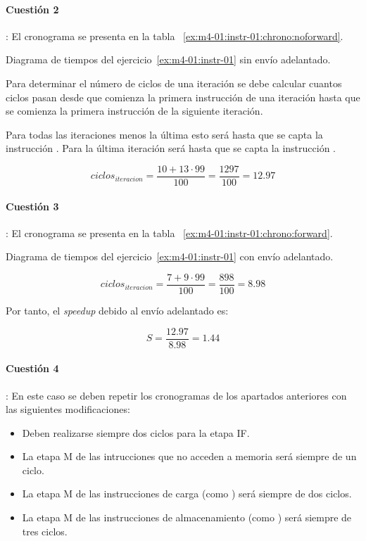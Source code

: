 \paragraph{Cuestión 2}: El cronograma se presenta en la tabla ~\ref{ex:m4-01:instr-01:chrono:noforward}.

\begin{table}[htb]

\caption{Diagrama de tiempos del ejercicio~\ref{ex:m4-01:instr-01} sin envío adelantado.}
\label{ex:m4-01:instr-01:chrono:noforward}
\end{table}

Para determinar el número de ciclos de una iteración se debe calcular cuantos ciclos
pasan desde que comienza la primera instrucción de una iteración hasta que se comienza
la primera instrucción de la siguiente iteración.

Para todas las iteraciones menos la última esto será hasta que se capta la
instrucción . Para la última iteración será hasta que se capta la
instrucción .

\[
ciclos_{iteracion} = \frac{10 + 13 \cdot 99}{100} = \frac{1297}{100} = 12.97
\]

\paragraph{Cuestión 3}: El cronograma se presenta en la tabla ~\ref{ex:m4-01:instr-01:chrono:forward}.

\begin{table}[htb]

\caption{Diagrama de tiempos del ejercicio~\ref{ex:m4-01:instr-01} con envío adelantado.}
\label{ex:m4-01:instr-01:chrono:forward}
\end{table}

\[
ciclos_{iteracion} = \frac{7 + 9 \cdot 99}{100} = \frac{898}{100} = 8.98
\]

Por tanto, el \emph{speedup} debido al envío adelantado es:

\[
S = \frac{12.97}{8.98} = 1.44
\]

\paragraph{Cuestión 4}: En este caso se deben repetir los cronogramas de los apartados anteriores
con las siguientes modificaciones:
\begin{itemize}
  \item Deben realizarse siempre dos ciclos para la etapa IF.
  \item La etapa M de las intrucciones que no acceden a memoria será siempre de un ciclo.
  \item La etapa M de las instrucciones de carga (como ) será siempre de dos ciclos.
  \item La etapa M de las instrucciones de almacenamiento (como ) será siempre de tres ciclos.
\end{itemize}
